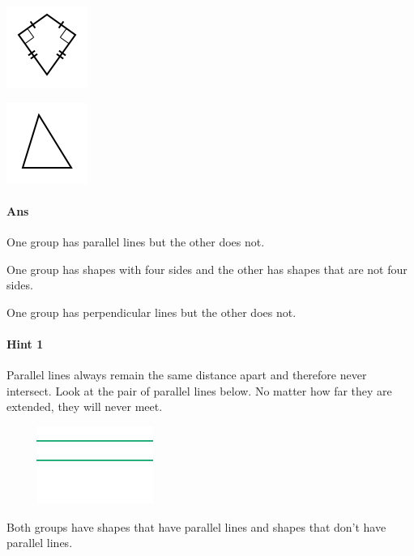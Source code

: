 \documentclass[twocolumn,10pt]{article}
\def\shrinkfactor{0.55}
\begin{document}
\includegraphics[scale=\shrinkfactor]{figures/be0b4c8e85edc438c12910c91d66875e8fcd2372.png}

\includegraphics[scale=\shrinkfactor]{figures/ee7f87a00acb47dec4f2b2eed9a6741b21afc47d.png}



\paragraph{Ans} 

One group has parallel lines but the other does not.


 One group has shapes with four sides and the other has shapes that are not four sides.

One group has perpendicular lines but the other does not.



\paragraph{Hint 1}Parallel lines always remain the same distance apart and therefore never intersect.  Look at the pair of parallel lines below.  No matter how far they are extended, they will never meet.

$\phantom{xxxx}$
\includegraphics[scale=\shrinkfactor]{figures/7cf1fbfb7516a57d37ad80007a3886c81c33f393.png}  

Both groups have shapes that have parallel lines and shapes that don't have parallel lines.
\end{document}
